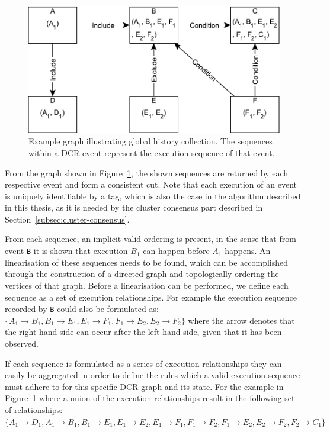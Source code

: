 \documentclass{article}
\begin{document}
	\begin{figure}[ht!]
		\center
		\includegraphics[scale=0.6]{figures/dcr-graphs/global-history-collection-example.pdf}
		\caption{Example graph illustrating global history collection. The sequences within a DCR event represent the execution sequence of that event.}
		\label{fig:global-history-collection-example}
	\end{figure}

	From the graph shown in Figure~\ref{fig:global-history-collection-example}, the shown sequences are returned by each respective event and form a consistent cut.
	Note that each execution of an event is uniquely identifiable by a tag, which is also the case in the algorithm described in this thesis, as it is needed by the cluster consensus part described in Section~\ref{subsec:cluster-consensus}.

	From each sequence, an implicit valid ordering is present, in the sense that from event \texttt{B} it is shown that execution $B_1$ can happen before $A_1$ happens.
	An linearisation of these sequences needs to be found, which can be accomplished through the construction of a directed graph and topologically ordering the vertices of that graph.
	Before a linearisation can be performed, we define each sequence as a set of execution relationships.
	For example the execution sequence recorded by \texttt{B} could also be formulated as: $\{A_1 \rightarrow B_1, B_1 \rightarrow E_1, E_1 \rightarrow F_1, F_1 \rightarrow E_2, E_2 \rightarrow F_2\}$ where the arrow denotes that the right hand side can occur after the left hand side, given that it has been observed.

	If each sequence is formulated as a series of execution relationships they can easily be aggregated in order to define the rules which a valid execution sequence must adhere to for this specific DCR graph and its state.
	For the example in Figure~\ref{fig:global-history-collection-example} where a union of the execution relationships result in the following set of relationships: $\{A_1 \rightarrow D_1, A_1 \rightarrow B_1, B_1 \rightarrow E_1, E_1 \rightarrow E_2, E_1 \rightarrow F_1, F_1 \rightarrow F_2, F_1 \rightarrow E_2, E_2 \rightarrow F_2, F_2 \rightarrow C_1\}$
\end{document}
